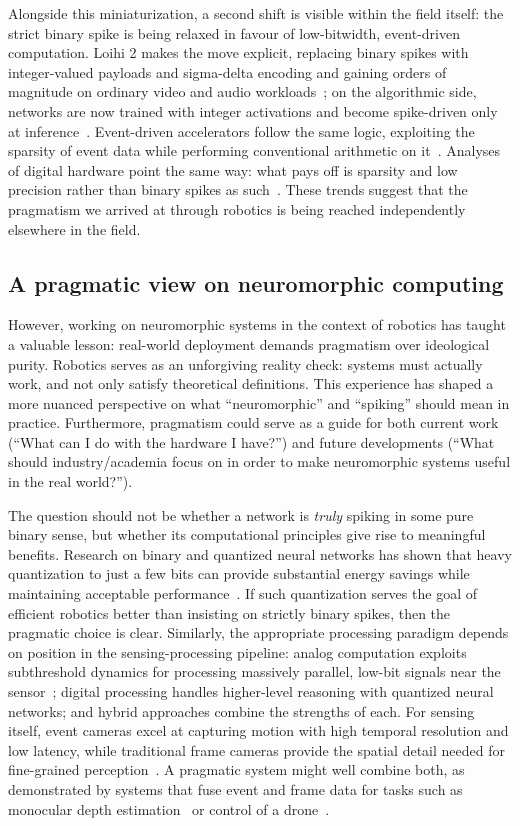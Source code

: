 Alongside this miniaturization, a second shift is visible within the field itself: the strict binary spike is being relaxed in favour of low-bitwidth, event-driven computation. Loihi 2 makes the move explicit, replacing binary spikes with integer-valued payloads and sigma-delta encoding and gaining orders of magnitude on ordinary video and audio workloads~\cite{shrestha2024efficient}; on the algorithmic side, networks are now trained with integer activations and become spike-driven only at inference~\cite{luo2024integer}. Event-driven accelerators follow the same logic, exploiting the sparsity of event data while performing conventional arithmetic on it~\cite{yang2025evgnn,yao2024spikebased}. Analyses of digital hardware point the same way: what pays off is sparsity and low precision rather than binary spikes as such~\cite{ottati2023spike}. These trends suggest that the pragmatism we arrived at through robotics is being reached independently elsewhere in the field.

\subsection*{A pragmatic view on neuromorphic computing}

However, working on neuromorphic systems in the context of robotics has taught a valuable lesson: real-world deployment demands pragmatism over ideological purity. Robotics serves as an unforgiving reality check: systems must actually work, and not only satisfy theoretical definitions. This experience has shaped a more nuanced perspective on what ``neuromorphic'' and ``spiking'' should mean in practice. Furthermore, pragmatism could serve as a guide for both current work (``What can I do with the hardware I have?'') and future developments (``What should industry/academia focus on in order to make neuromorphic systems useful in the real world?'').

The question should not be whether a network is \emph{truly} spiking in some pure binary sense, but whether its computational principles give rise to meaningful benefits. Research on binary and quantized neural networks has shown that heavy quantization to just a few bits can provide substantial energy savings while maintaining acceptable performance~\cite{qin2020binary}. If such quantization serves the goal of efficient robotics better than insisting on strictly binary spikes, then the pragmatic choice is clear. Similarly, the appropriate processing paradigm depends on position in the sensing-processing pipeline: analog computation exploits subthreshold dynamics for processing massively parallel, low-bit signals near the sensor~\cite{buchel2021supervised}; digital processing handles higher-level reasoning with quantized neural networks; and hybrid approaches combine the strengths of each. For sensing itself, event cameras excel at capturing motion with high temporal resolution and low latency, while traditional frame cameras provide the spatial detail needed for fine-grained perception~\cite{gallego2020eventbased}. A pragmatic system might well combine both, as demonstrated by systems that fuse event and frame data for tasks such as monocular depth estimation~\cite{gehrig2021combining} or control of a drone~\cite{bian2023colibriuav}.


